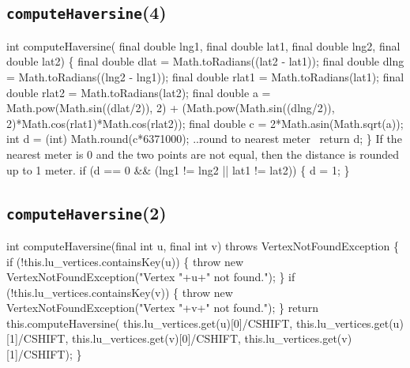 \subsection{\texttt{computeHaversine}(4)}
\nwenddocs{}\endmoddef{}
int computeHaversine(
    final double lng1, final double lat1, final double lng2, final double lat2) \{
  final double  dlat = Math.toRadians((lat2 - lat1));
  final double  dlng = Math.toRadians((lng2 - lng1));
  final double rlat1 = Math.toRadians(lat1);
  final double rlat2 = Math.toRadians(lat2);
  final double a = Math.pow(Math.sin((dlat/2)), 2)
    + (Math.pow(Math.sin((dlng/2)), 2)*Math.cos(rlat1)*Math.cos(rlat2));
  final double c = 2*Math.asin(Math.sqrt(a));
  int d = (int) Math.round(c*6371000);
  \LA{}..round to nearest meter~{\nwtagstyle{}}\RA{}
  return d;
\}
\eatline
{}\nwendcode{}If the nearest meter is 0 and the two points are not equal, then the distance
is rounded up to 1 meter.
\nwenddocs{}\endmoddef{}
if (d == 0 && (lng1 != lng2 || lat1 != lat2)) \{
  d = 1;
\}
\nwendcode{}\nwdocspar

\subsection{\texttt{computeHaversine}(2)}
\nwenddocs{}\endmoddef{}
int computeHaversine(final int u, final int v) throws VertexNotFoundException \{
  if (!this.lu_vertices.containsKey(u)) \{
    throw new VertexNotFoundException("Vertex "+u+" not found.");
  \}
  if (!this.lu_vertices.containsKey(v)) \{
    throw new VertexNotFoundException("Vertex "+v+" not found.");
  \}
  return this.computeHaversine(
    this.lu_vertices.get(u)[0]/CSHIFT, this.lu_vertices.get(u)[1]/CSHIFT,
    this.lu_vertices.get(v)[0]/CSHIFT, this.lu_vertices.get(v)[1]/CSHIFT);
\}
\nwendcode{}\nwdocspar

